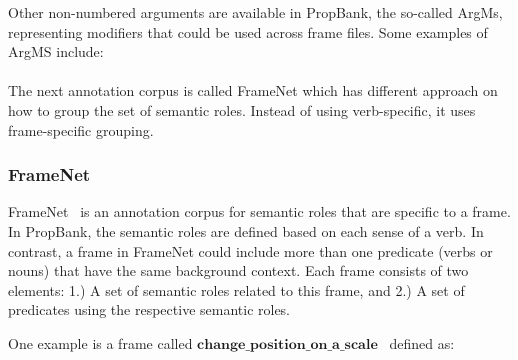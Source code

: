 Other non-numbered arguments are available in PropBank, the so-called ArgMs, representing modifiers that could be used across frame files. Some examples of ArgMS include:
\\
\\

The next annotation corpus is called FrameNet which has different approach on how to group the set of semantic roles. Instead of using verb-specific, it uses frame-specific grouping.

\subsubsection{FrameNet}
FrameNet~\citep{baker1998berkeley} is an annotation corpus for semantic roles that are specific to a frame. In PropBank, the semantic roles are defined based on each sense of a verb. In contrast, a frame in FrameNet could include more than one predicate (verbs or nouns) that have the same background context. Each frame consists of two elements: 1.) A set of semantic roles related to this frame, and 2.) A set of predicates using the respective semantic roles.

One example is a frame called $\mathbf{change\_position\_on\_a\_scale}$~\citep{jurafsky2016speech} defined as:
\\
\\

